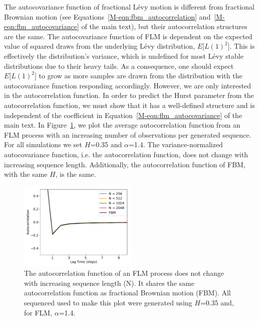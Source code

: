 \documentclass{article}
\begin{document}
  The autocovariance function of fractional L\'evy motion is different from fractional
  Brownian motion (see Equations~\ref{M-eqn:fbm_autocorrelation}
  and~\ref{M-eqn:flm_autocovariance} of the main text), but their autocorrelation 
  structures are the same. The autocovariance function of FLM is dependent on the 
  expected value of squared draws from the underlying L\'evy distribution, $E\big[L(1)^2\big]$. 
  This is effectively the distribution's variance, which is undefined for most 
  L\'evy stable distributions due to their heavy tails. As a consequence, one should 
  expect $E\big[L(1)^2\big]$ to grow as more samples are drawn from the distribution
  with the autocovariance function responding accordingly. 
  However, we are only interested in the autocorrelation function. In order to predict
  the Hurst parameter from the autocorrelation function, we must show that it has 
  a well-defined structure and is independent of the coefficient in 
  Equation~\ref{M-eqn:flm_autocovariance} of the main text. In Figure~\ref{fig:flm_autocorrelation}, 
  we plot the average autocorrelation function from an FLM process with an increasing 
  number of observations per generated sequence. For all simulations we set $H$=0.35 
  and $\alpha$=1.4. The variance-normalized autocovariance function, i.e. the autocorrelation
  function, does not change with increasing sequence length. Additionally, the
  autocorrelation function of FBM, with the same $H$, is the same.
  
  \begin{figure}
  \centering
  \includegraphics[width=0.5\textwidth]{flm_autocovariance.pdf}
  \caption{The autocorrelation function of an FLM process does not change with 
  increasing sequence length (N). It shares the same autocorrelation function as
  fractional Brownian motion (FBM). All sequenced used to make this plot were 
  generated using $H$=0.35 and, for FLM, $\alpha$=1.4.}\label{fig:flm_autocorrelation}
  \end{figure}
  
\end{document}
